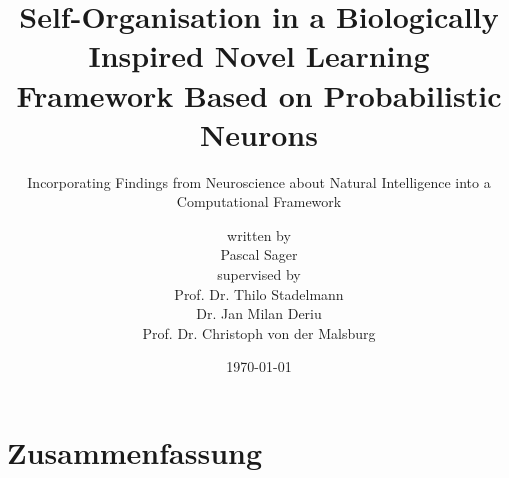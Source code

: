 \documentclass[
    fontsize=10pt,
    twoside=true,
    numbers=noenddot
]{cls/phdbyphd}
\theoremstyle{plain}
\begin{document}

\titlehead{Master of Science in Engineering with Specialisation in Data Science}

\subject{Master Thesis}
\title[Self-Organisation in a Biologically Inspired Novel Learning Framework Based on Probabilistic Neurons]{Self-Organisation in a Biologically Inspired Novel Learning Framework Based on Probabilistic Neurons}
\subtitle{Incorporating Findings from Neuroscience about Natural Intelligence into a Computational Framework}

\author[Pascal Sager]{{\small written by}\\Pascal Sager\\[1ex]  {\small supervised by}\\{\large Prof. Dr. Thilo Stadelmann}\\{\large Dr. Jan Milan Deriu}\\{\large Prof. Dr. Christoph von der Malsburg}\\[4ex]}

\date{\today}

\publishers{Zurich University of Applied Sciences\\Centre for Artificial Intelligence}

\frontmatter
{}


\maketitle


\setlength{\textheight}{23.5cm}

\chapter*{Zusammenfassung}
    
    
\end{document}
